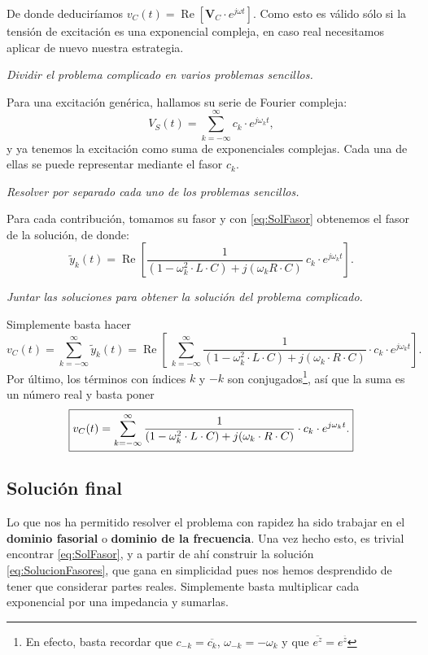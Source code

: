 De donde deduciríamos $v_C(t) = \operatorname{Re} \left[\mathbf{V}_C \cdot e^{j\omega t}\right]$. Como esto es válido sólo si la tensión de excitación es una exponencial compleja, en caso real necesitamos aplicar de nuevo nuestra estrategia.

\begin{enumerate}[{\bfseries [1]}]
  \item\textit{\color{blue} Dividir el problema complicado en varios problemas sencillos.}

    Para una excitación genérica, hallamos su serie de Fourier compleja:
    \[
    V_S(t) = \sum_{k=-\infty}^\infty c_k \cdot e^{j\omega_k t},
    \]
    y ya tenemos la excitación como suma de exponenciales complejas. Cada una de ellas se puede representar mediante el fasor $c_k$.
  \item \textit{\color{blue}Resolver por separado cada uno de los problemas sencillos.}

    Para cada contribución, tomamos su fasor y con \eqref{eq:SolFasor} obtenemos el fasor de la solución, de donde:
    \[\boxed{
      \tilde{y}_k (t)= \operatorname{Re}\left[\frac{1}{(1-\omega_k^2 \cdot  L\cdot C) + j(\omega_k R\cdot C)}\ c_k\cdot  e^{j\omega_k t}\right].
    }\]
  \item \textit{\color{blue}Juntar las soluciones para obtener la solución del problema complicado.}

    Simplemente basta hacer
    \[
    v_C(t) =  \sum_{k=-\infty}^\infty \tilde{y}_k(t) = \operatorname{Re}\left[\ \sum_{k=-\infty}^\infty \frac{1}{(1-\omega_k^2 \cdot L\cdot C) + j(\omega_k\cdot R\cdot C)}\cdot  c_k\cdot e^{j\omega_k t}  \right].
    \] 
    Por último, los términos con índices $k$ y $-k$ son conjugados\footnote{En efecto, basta recordar que $c_{-k} = \overline{c_k}$, $\omega_{-k}=-\omega_k$ y que $\overline{e^z}=e^{\overline{z}}$}, así que la suma es un número real y basta poner
    \begin{equation} \boxed{
      \label{eq:SolucionFasores}
      v_C(t) = \sum_{k=-\infty}^\infty \frac{1}{(1-\omega_k^2 \cdot L\cdot C) + j(\omega_k\cdot R\cdot C)}\cdot c_k \cdot e^{j\omega_k t}.
    } \end{equation}
\end{enumerate}




\subsection{Solución final}
Lo que nos ha permitido resolver el problema con rapidez ha sido trabajar en el \textbf{dominio fasorial} o \textbf{dominio de la frecuencia}. Una vez hecho esto, es trivial encontrar \eqref{eq:SolFasor}, y a partir de ahí construir la solución \eqref{eq:SolucionFasores}, que gana en simplicidad pues nos hemos desprendido de tener que considerar partes reales. Simplemente basta multiplicar cada exponencial por una impedancia y sumarlas.

